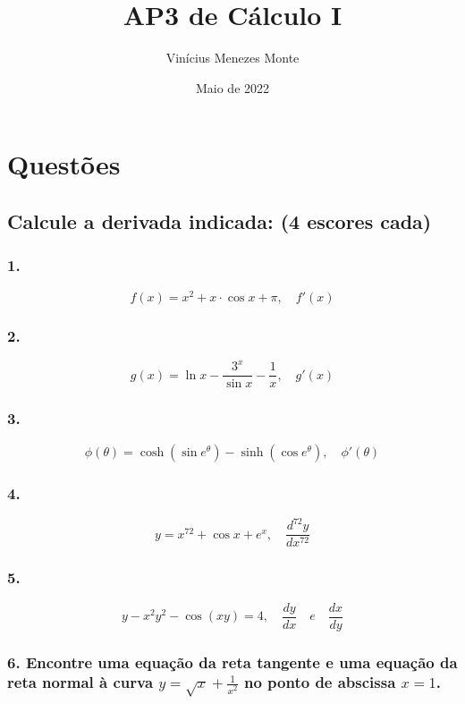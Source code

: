 \documentclass{article}
\title{AP3 de Cálculo I}
\author{Vinícius Menezes Monte}
\date{Maio de 2022}
\begin{document}
\maketitle

\section*{Questões}
\subsection*{Calcule a derivada indicada: (4 escores cada)}

\subsubsection*{1.}

\[
    f(x) = x^2 + x \cdot \cos x + \pi , \quad f'(x)
\]

\subsubsection*{2.}

\[
    g(x) = \ln x - \frac{3^x}{\sin x} - \frac{1}{x}, \quad g'(x)
\]

\subsubsection*{3.}

\[
    \phi(\theta) = \cosh(\sin e^{\theta}) - \sinh(\cos e^{\theta}), \quad \phi'(\theta)
\]

\subsubsection*{4.}

\[
    y = x^{72} + \cos x + e^x, \quad \frac{d^{72}y}{dx^{72}}
\]

\subsubsection*{5.}

\[
    y - x^2y^2 - \cos(xy) = 4, \quad \frac{dy}{dx} \quad e \quad \frac{dx}{dy}
\]

\subsubsection*{6. Encontre uma equação da reta tangente e uma equação da reta normal à curva \(y = \sqrt{x} + \frac{1}{x^2}\) no ponto de abscissa \(x=1\).}
\end{document}
